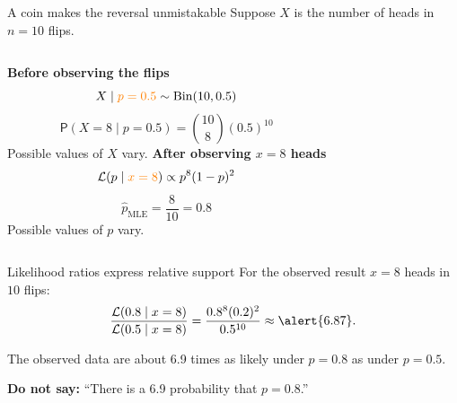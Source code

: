 \documentclass[12pt]{beamer}
\newcommand{\prob}{\mathsf{P}}
\newcommand{\lik}{\mathcal{L}}
\newcommand{\fixed}[1]{\textcolor{orange}{#1}}
\begin{document}
\begin{frame}{}
\begin{block}{A coin makes the reversal unmistakable}
\small
Suppose $X$ is the number of heads in $n=10$ flips.
\vspace{0.25cm}
\begin{columns}[T,onlytextwidth]
\textbf{Before observing the flips}
\[
X\mid\fixed{p=0.5}\sim\mathrm{Bin}(10,0.5)
\]
\[
\prob(X=8\mid p=0.5)=\binom{10}{8}(0.5)^{10}
\]
Possible values of $X$ vary.
\textbf{After observing $x=8$ heads}
\[
\lik(p\mid\fixed{x=8})\propto p^8(1-p)^2
\]
\[
\hat p_{\mathrm{MLE}}=\frac{8}{10}=0.8
\]
Possible values of $p$ vary.
\end{columns}
\end{block}
\end{frame}

\begin{frame}{}
\begin{block}{Likelihood ratios express relative support}
For the observed result $x=8$ heads in $10$ flips:
\[
\frac{\lik(0.8\mid x=8)}{\lik(0.5\mid x=8)}
=\frac{0.8^8(0.2)^2}{0.5^{10}}
\approx\alert{6.87}.
\]

\begin{block}{}
The observed data are about 6.9 times as likely under $p=0.8$ as under $p=0.5$.
\end{block}
\vspace{0.25cm}
\centering
\textbf{Do not say:} ``There is a 6.9 probability that $p=0.8$.''
\end{block}
\end{frame}
\end{document}
